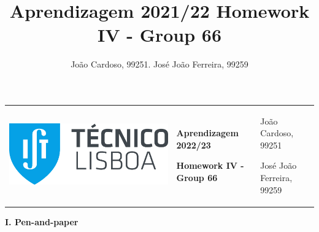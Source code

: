 \documentclass[11pt,a4paper]{article}
\title{Aprendizagem 2021/22 Homework IV - Group 66}
\author{João Cardoso, 99251. José João Ferreira, 99259}
\begin{document}
\color{darkgray}
\hspace{-8.25mm}
\renewcommand\tabularxcolumn[1]{m{#1}}
\begin{tabularx}{1.09\textwidth} {>{\raggedright\arraybackslash}X >{\centering\arraybackslash}X >{\raggedleft\arraybackslash}X}
  \includegraphics[scale=0.2]{tecnico.pdf}                           &
  \textbf{Aprendizagem 2022/23} \par \textbf{Homework IV - Group 66} &
  João Cardoso, 99251 \par José João Ferreira, 99259
\end{tabularx}
\renewcommand\tabularxcolumn[1]{p{#1}}
\color{black}

\begin{center}
  \textbf{I. Pen-and-paper}
\end{center}
\end{document}
